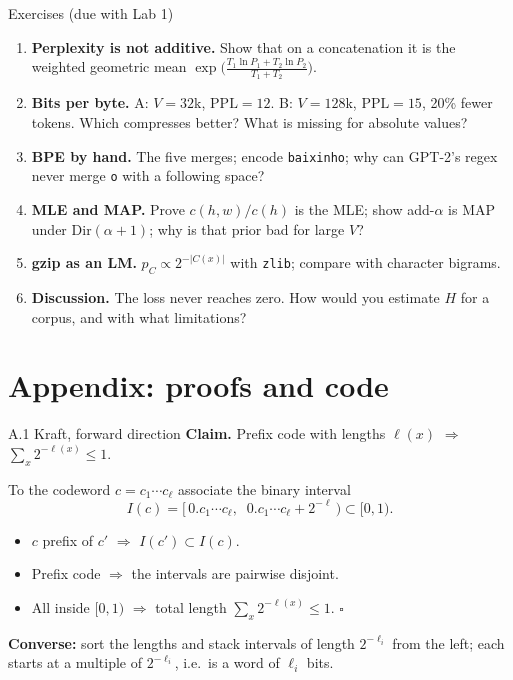 \documentclass[11pt,aspectratio=169]{beamer}
\newcommand{\PPL}{\mathrm{PPL}}
\begin{document}
\begin{frame}{Exercises (due with Lab 1)}
  \begin{enumerate}
    \item \textbf{Perplexity is not additive.} Show that on a concatenation it is the
          weighted geometric mean $\exp\!\big(\tfrac{T_1\ln P_1 + T_2\ln P_2}{T_1+T_2}\big)$.
    \item \textbf{Bits per byte.} A: $V = 32$k, $\PPL = 12$. B: $V = 128$k, $\PPL = 15$, 20\%
          fewer tokens. Which compresses better? What is missing for absolute values?
    \item \textbf{BPE by hand.} The five merges; encode \texttt{baixinho}; why can GPT-2's
          regex never merge \texttt{o} with a following space?
    \item \textbf{MLE and MAP.} Prove $c(h,w)/c(h)$ is the MLE; show add-$\alpha$ is MAP under
          $\mathrm{Dir}(\alpha+1)$; why is that prior bad for large $V$?
    \item \textbf{gzip as an LM.} $p_C \propto 2^{-|C(x)|}$ with \texttt{zlib}; compare with
          character bigrams.
    \item \textbf{Discussion.} The loss never reaches zero. How would you estimate $H$ for a
          corpus, and with what limitations?
  \end{enumerate}
\end{frame}

\section{Appendix: proofs and code}

\begin{frame}{A.1 Kraft, forward direction}
  \textbf{Claim.} Prefix code with lengths $\ell(x)$ $\Rightarrow$ $\sum_x 2^{-\ell(x)}\le 1$.

  \vspace{0.8em}
  To the codeword $c = c_1\cdots c_\ell$ associate the binary interval
  \[
    I(c) = \big[\,0.c_1\cdots c_\ell,\;\; 0.c_1\cdots c_\ell + 2^{-\ell}\,\big)\subset[0,1).
  \]
  \begin{itemize}
    \item $c$ prefix of $c'$ $\Rightarrow$ $I(c')\subset I(c)$.
    \item Prefix code $\Rightarrow$ the intervals are pairwise disjoint.
    \item All inside $[0,1)$ $\Rightarrow$ total length $\sum_x 2^{-\ell(x)}\le 1$. $\square$
  \end{itemize}

  \vspace{0.6em}
  \textbf{Converse:} sort the lengths and stack intervals of length $2^{-\ell_i}$ from the
  left; each starts at a multiple of $2^{-\ell_i}$, i.e.\ is a word of $\ell_i$ bits.
\end{frame}
\end{document}
